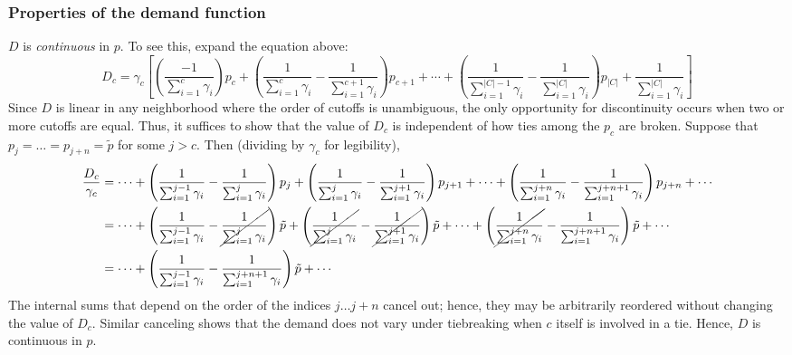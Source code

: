 \documentclass[12pt]{article}
\theoremstyle{definition}
\begin{document}
\subsubsection{Properties of the demand function}
$D$ is \emph{continuous} in $p$. To see this, expand the equation above:
\scriptsize\[D_c = \gamma_c \left[ \left(\frac{-1}{\sum_{i=1}^c \gamma_i}\right) p_c
+ \left(\frac{1}{\sum_{i=1}^{c} \gamma_i} - \frac{1}{\sum_{i=1}^{c+1} \gamma_i} \right) p_{c+1}
+ \cdots
+ \left(\frac{1}{\sum_{i=1}^{|C|-1} \gamma_i} - \frac{1}{\sum_{i=1}^{|C|} \gamma_i}\right) p_{|C|}
+ \frac{1}{\sum_{i=1}^{|C|} \gamma_i}
\right]\]
\normalsize Since $D$ is linear in any neighborhood where the order of cutoffs is unambiguous, the only opportunity for discontinuity occurs when two or more cutoffs are equal. Thus, it suffices to show that the value of $D_c$ is independent of how ties among the $p_c$ are broken. Suppose that $p_j = \dots = p_{j+n} = \tilde p$ for some $j > c$. Then (dividing by $\gamma_c$ for legibility),
\scriptsize \begin{align}
\frac{D_c}{\gamma_c} &= \cdots
+ \left(\frac{1}{\sum_{i=1}^{j-1} \gamma_i} - \frac{1}{\sum_{i=1}^{j} \gamma_i} \right) p_{j}
+ \left(\frac{1}{\sum_{i=1}^{j} \gamma_i} - \frac{1}{\sum_{i=1}^{j+1} \gamma_i} \right) p_{j+1}
+ \cdots
+ \left(\frac{1}{\sum_{i=1}^{j+n} \gamma_i} - \frac{1}{\sum_{i=1}^{j+n+1} \gamma_i}\right) p_{j+n}
+ \cdots \\
&= \cdots
+ \left(\frac{1}{\sum_{i=1}^{j-1} \gamma_i} - \cancel{\frac{1}{\sum_{i=1}^{j} \gamma_i}} \right) \tilde p
+ \left(\cancel{\frac{1}{\sum_{i=1}^{j} \gamma_i}} - \cancel{\frac{1}{\sum_{i=1}^{j+1} \gamma_i}} \right) \tilde p
+ \cdots
+ \left(\cancel{\frac{1}{\sum_{i=1}^{j+n} \gamma_i}} - \frac{1}{\sum_{i=1}^{j+n+1} \gamma_i}\right) \tilde p
+ \cdots \\
&= \cdots
+ \left(\frac{1}{\sum_{i=1}^{j-1} \gamma_i} - \frac{1}{\sum_{i=1}^{j+n+1} \gamma_i}\right) \tilde p
+ \cdots
\end{align}
\normalsize The internal sums that depend on the order of the indices $j \dots j+n$ cancel out; hence, they may be arbitrarily reordered without changing the value of $D_c$. Similar canceling shows that the demand does not vary under tiebreaking when $c$ itself is involved in a tie. Hence, $D$ is continuous in $p$. 
\end{document}
